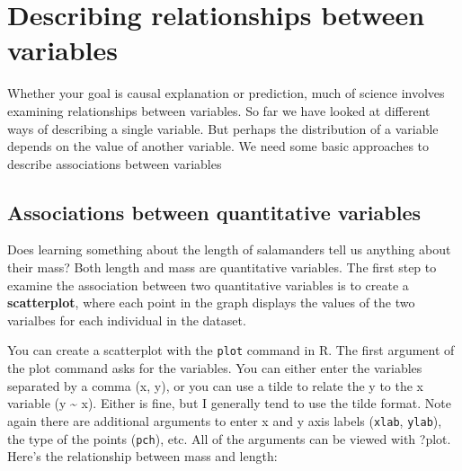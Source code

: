 \documentclass[
]{book}
\newenvironment{Shaded}{\begin{snugshade}}{\end{snugshade}}
\newcommand{\AttributeTok}[1]{\textcolor[rgb]{0.13,0.29,0.53}{#1}}
\newcommand{\CommentTok}[1]{\textcolor[rgb]{0.56,0.35,0.01}{\textit{#1}}}
\newcommand{\DecValTok}[1]{\textcolor[rgb]{0.00,0.00,0.81}{#1}}
\newcommand{\FunctionTok}[1]{\textcolor[rgb]{0.13,0.29,0.53}{\textbf{#1}}}
\newcommand{\NormalTok}[1]{#1}
\newcommand{\SpecialCharTok}[1]{\textcolor[rgb]{0.81,0.36,0.00}{\textbf{#1}}}
\newcommand{\StringTok}[1]{\textcolor[rgb]{0.31,0.60,0.02}{#1}}
\begin{document}
\section{Describing relationships between variables}\label{describing-relationships-between-variables}

Whether your goal is causal explanation or prediction, much of science involves examining relationships between variables. So far we have looked at different ways of describing a single variable. But perhaps the distribution of a variable depends on the value of another variable. We need some basic approaches to describe associations between variables

\subsection{Associations between quantitative variables}\label{associations-between-quantitative-variables}

Does learning something about the length of salamanders tell us anything about their mass? Both length and mass are quantitative variables. The first step to examine the association between two quantitative variables is to create a \textbf{scatterplot}, where each point in the graph displays the values of the two varialbes for each individual in the dataset.

You can create a scatterplot with the \texttt{plot} command in R. The first argument of the plot command asks for the variables. You can either enter the variables separated by a comma (x, y), or you can use a tilde to relate the y to the x variable (y \textasciitilde{} x). Either is fine, but I generally tend to use the tilde format. Note again there are additional arguments to enter x and y axis labels (\texttt{xlab}, \texttt{ylab}), the type of the points (\texttt{pch}), etc. All of the arguments can be viewed with ?plot. Here's the relationship between mass and length:

\begin{Shaded}
\end{Shaded}
\end{document}
